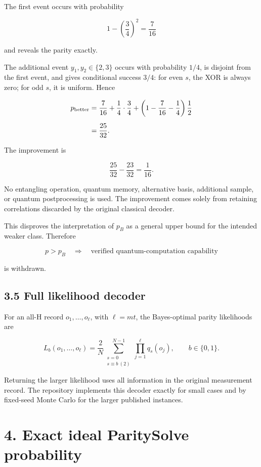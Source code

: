 \documentclass[
  10pt,
]{article}
\begin{document}
The first event occurs with probability

\[
1-\left(\frac34\right)^2=\frac7{16}
\]

and reveals the parity exactly.

The additional event \(y_1,y_2\in\{2,3\}\) occurs with probability
\(1/4\), is disjoint from the first event, and gives conditional success
\(3/4\): for even \(s\), the XOR is always zero; for odd \(s\), it is
uniform. Hence

\[
\begin{aligned}
p_{\rm better}
&=
\frac7{16}
+
\frac14\cdot\frac34
+
\left(1-\frac7{16}-\frac14\right)\frac12\\[2mm]
&=
\frac{25}{32}.
\end{aligned}
\]

The improvement is

\[
\frac{25}{32}-\frac{23}{32}=\frac1{16}.
\]

No entangling operation, quantum memory, alternative basis, additional
sample, or quantum postprocessing is used. The improvement comes solely
from retaining correlations discarded by the original classical decoder.

This disproves the interpretation of \(p_B\) as a general upper bound
for the intended weaker class. Therefore

\[
p>p_B
\quad\Longrightarrow\quad
\text{verified quantum-computation capability}
\]

is withdrawn.

\subsection{3.5 Full likelihood decoder}\label{full-likelihood-decoder}

For an all-H record \(o_1,\ldots,o_\ell\), with \(\ell=mt\), the
Bayes-optimal parity likelihoods are

\[
L_b(o_1,\ldots,o_\ell)
=
\frac2N
\sum_{\substack{s=0\\s\equiv b\ (2)}}^{N-1}
\prod_{j=1}^{\ell}q_s(o_j),
\qquad b\in\{0,1\}.
\]

Returning the larger likelihood uses all information in the original
measurement record. The repository implements this decoder exactly for
small cases and by fixed-seed Monte Carlo for the larger published
instances.

\section{4. Exact ideal ParitySolve
probability}\label{exact-ideal-paritysolve-probability}
\end{document}
